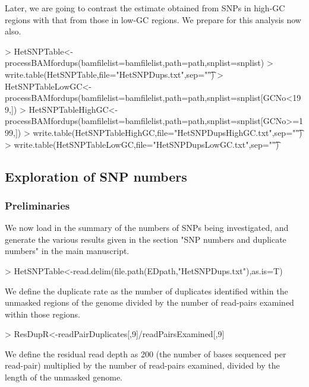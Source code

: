\documentclass{article}
\begin{document}
Later, we are going to contrast the estimate obtained from SNPs in high-GC regions with that from those in low-GC regions. We prepare for this analysis now also.

\begin{Schunk}
\begin{Sinput}
> HetSNPTable<-processBAMfordups(bamfilelist=bamfilelist,path=path,snplist=snplist)
> write.table(HetSNPTable,file="HetSNPDups.txt",sep="\t")
> HetSNPTableLowGC<-processBAMfordups(bamfilelist=bamfilelist,path=path,snplist=snplist[GCNo<199,])
> HetSNPTableHighGC<-processBAMfordups(bamfilelist=bamfilelist,path=path,snplist=snplist[GCNo>=199,])
> write.table(HetSNPTableHighGC,file="HetSNPDupsHighGC.txt",sep="\t") 
> write.table(HetSNPTableLowGC,file="HetSNPDupsLowGC.txt",sep="\t")
\end{Sinput}
\end{Schunk}


\subsection{Exploration of SNP numbers}
\subsubsection{Preliminaries}

We now load in the summary of the numbers of SNPs being investigated, and generate the various results given in the section "SNP numbers and duplicate numbers" in the main manuscript.

\begin{Schunk}
\begin{Sinput}
> HetSNPTable<-read.delim(file.path(EDpath,"HetSNPDups.txt"),as.is=T)
\end{Sinput}
\end{Schunk}

We define the duplicate rate as the number of duplicates identified within the unmasked regions of the genome divided by the number of read-pairs examined within those regions.

\begin{Schunk}
\begin{Sinput}
> ResDupR<-readPairDuplicates[,9]/readPairsExamined[,9]
\end{Sinput}
\end{Schunk}

We define the residual read depth as 200 (the number of bases sequenced per read-pair) multiplied by the number of read-pairs examined, divided by the length of the unmasked genome.
\end{document}
